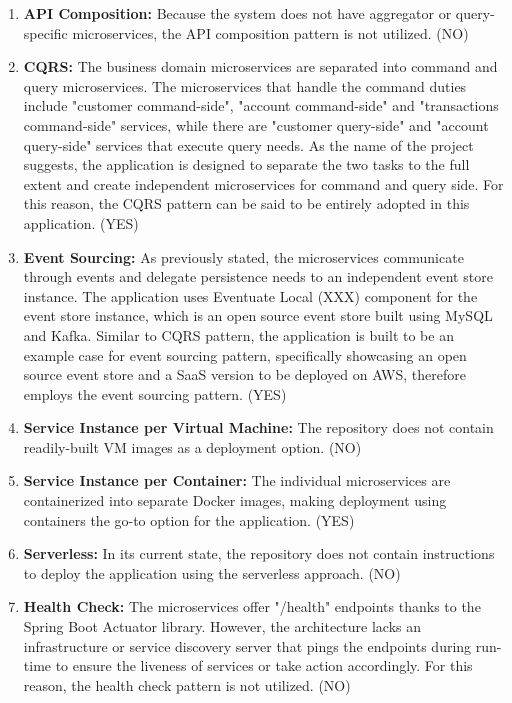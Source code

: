 \documentclass{Configuration_Files/PoliMi3i_thesis}
\begin{document}
\begin{enumerate}
    \item \textbf{API Composition:} Because the system does not have aggregator or query-specific microservices, the API composition pattern is not utilized. (NO)
    
    \item \textbf{CQRS:} The business domain microservices are separated into command and query microservices.
    The microservices that handle the command duties include "customer command-side", "account command-side" and "transactions command-side" services, while there are "customer query-side" and "account query-side" services that execute query needs.
    As the name of the project suggests, the application is designed to separate the two tasks to the full extent and create independent microservices for command and query side.
    For this reason, the CQRS pattern can be said to be entirely adopted in this application. (YES)
    
    \item \textbf{Event Sourcing:} As previously stated, the microservices communicate through events and delegate persistence needs to an independent event store instance.
    The application uses Eventuate Local (XXX) component for the event store instance, which is an open source event store built using MySQL and Kafka.
    Similar to CQRS pattern, the application is built to be an example case for event sourcing pattern, specifically showcasing an open source event store and a SaaS version to be deployed on AWS, therefore employs the event sourcing pattern. (YES)
    
    \item \textbf{Service Instance per Virtual Machine:} The repository does not contain readily-built VM images as a deployment option. (NO)
    
    \item \textbf{Service Instance per Container:} The individual microservices are containerized into separate Docker images, making deployment using containers the go-to option for the application. (YES)
    
    \item \textbf{Serverless:} In its current state, the repository does not contain instructions to deploy the application using the serverless approach. (NO)
    
    \item \textbf{Health Check:} The microservices offer "/health" endpoints thanks to the Spring Boot Actuator library.
    However, the architecture lacks an infrastructure or service discovery server that pings the endpoints during run-time to ensure the liveness of services or take action accordingly.
    For this reason, the health check pattern is not utilized. (NO)
    

\end{enumerate}
\end{document}
